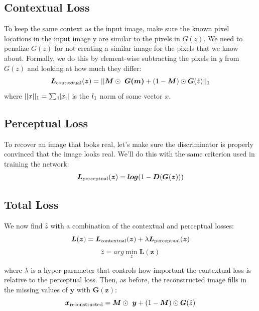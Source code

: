 \subsection{Contextual Loss} %
\label{sub:contextual_loss}
To keep the same context as the input image, make sure the known pixel locations in the input image y are similar to the pixels in $G(z)$. We need to penalize $G(z)$ for not creating a similar image for the pixels that we know about. Formally, we do this by element-wise subtracting the pixels in $y$ from $G(z)$ and looking at how much they differ:
\begin{equation} \label{eqn:contextual_loss}
\bm{L}\textsubscript{contextual}(\bm{z}) = || \bm{M} \odot\  \bm{G(m)} + (1 - \bm{M}) \odot \bm{G} (\hat z) || \textsubscript{1}
\end{equation}
where $||x|| \textsubscript{1}=\sum \textsubscript{i} |x \textsubscript{i}|$ is the $l \textsubscript{1}$ norm of some vector $x$.


\subsection{Perceptual Loss} %
\label{sub:perceptual_loss}
To recover an image that looks real, let’s make sure the discriminator is properly convinced that the image looks real. We’ll do this with the same criterion used in training the network:
\begin{equation} \label{eqn:perceptual_loss}
\bm{L}\textsubscript{perceptual}(\bm{z}) = \bm{log} (1 - \bm{D}(\bm{G}(\bm{z})))
\end{equation}

\subsection{Total Loss} %
\label{sub:total_loss}
We now find $\hat z$ with a combination of the contextual and perceptual losses:
\begin{equation} \label{eqn:total_loss}
\bm{L}(\bm{z}) = \bm{L}\textsubscript{contextual}(\bm{z}) + \lambda \bm{L}\textsubscript{perceptual}(\bm{z})
\end{equation}
\begin{equation} \label{eqn:minimization}
\hat z = arg \min_z \bm{L} (\bm{z})
\end{equation}

where $\lambda$ is a hyper-parameter that controls how important the contextual loss is relative to the perceptual loss. Then, as before, the reconstructed image fills in the missing values of $\bm{y}$ with $\bm{G}(\bm{z})$:
\begin{equation} \label{eqn:reconstructed_image_final}
\bm{x} \textsubscript{reconstructed} = \bm{M} \odot\  \bm{y} + (1 - \bm{M}) \odot \bm{G} (\hat z)
\end{equation}


